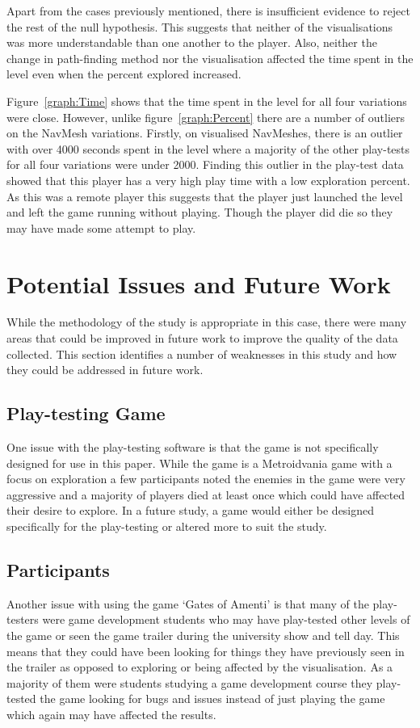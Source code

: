 \documentclass[journal]{IEEEtran}
\begin{document}
	Apart from the cases previously mentioned, there is insufficient evidence to reject the rest of the null hypothesis. This suggests that neither of the visualisations was more understandable than one another to the player. Also, neither the change in path-finding method nor the visualisation affected the time spent in the level even when the percent explored increased.
	
	Figure~\ref{graph:Time} shows that the time spent in the level for all four variations were close. However, unlike figure~\ref{graph:Percent} there are a number of outliers on the NavMesh variations. Firstly, on visualised NavMeshes, there is an outlier with over 4000 seconds spent in the level where a majority of the other play-tests for all four variations were under 2000. Finding this outlier in the play-test data showed that this player has a very high play time with a low exploration percent. As this was a remote player this suggests that the player just launched the level and left the game running without playing. Though the player did die so they may have made some attempt to play.
	
	
	\section{Potential Issues and Future Work} \label{PotentialIssues}
	While the methodology of the study is appropriate in this case, there were many areas that could be improved in future work to improve the quality of the data collected. This section identifies a number of weaknesses in this study and how they could be addressed in future work. 
	
	\subsection{Play-testing Game} 
	One issue with the play-testing software is that the game is not specifically designed for use in this paper. While the game is a Metroidvania game with a focus on exploration a few participants noted the enemies in the game were very aggressive and a majority of players died at least once which could have affected their desire to explore. In a future study, a game would either be designed specifically for the play-testing or altered more to suit the study.  
	
	\subsection{Participants}
	Another issue with using the game `Gates of Amenti' is that many of the play-testers were game development students who may have play-tested other levels of the game or seen the game trailer during the university show and tell day. This means that they could have been looking for things they have previously seen in the trailer as opposed to exploring or being affected by the visualisation. As a majority of them were students studying a game development course they play-tested the game looking for bugs and issues instead of just playing the game which again may have affected the results.
	
\end{document}

